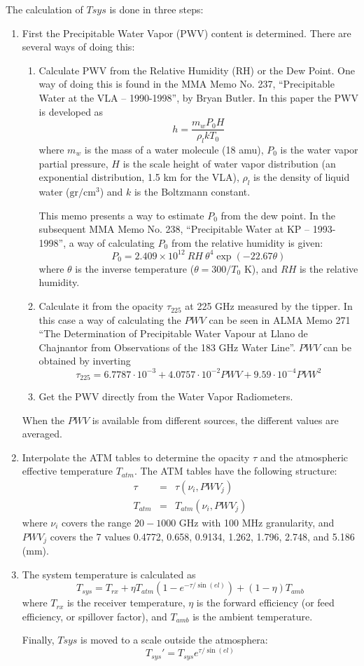 \documentclass{article}
\begin{document}
The calculation of $Tsys$ is done in three steps:
\begin{enumerate}
\item First the Precipitable Water Vapor (PWV) content is determined. There are
several ways of doing this:
\begin{enumerate}
\item Calculate PWV from the Relative Humidity (RH) or the Dew Point. One way
of doing this is found in the MMA Memo No. 237, ``Precipitable Water at the VLA --
1990-1998'', by Bryan Butler. In this paper the PWV is developed as
$$
h = \frac{m_w P_0 H}{\rho_l k T_0}
$$
where $m_w$ is the mass of a water molecule (18 amu), $P_0$ is the water vapor
partial pressure, $H$ is the scale height of water vapor distribution (an
exponential distribution, 1.5 km for the VLA), $\rho_l$ is the density of
liquid water ($\mathrm{gr}/\mathrm{cm}^3$) and $k$ is the Boltzmann constant.

This memo presents a way to estimate $P_0$ from the dew point. In the subsequent
MMA Memo No. 238, ``Precipitable Water at KP -- 1993-1998'', a way of calculating
$P_0$ from the relative humidity is given:
$$
P_0 = 2.409 \times 10^{12} \ RH\ \theta^4 \exp(-22.67\theta)
$$
where $\theta$ is the inverse temperature ($\theta = 300/T_0 $ K), and $RH$ is
the relative humidity.

\item Calculate it from the opacity $\tau_{225}$ at 225 GHz measured by the
tipper. In this case a way of calculating the $PWV$ can be seen in
ALMA Memo 271 ``The Determination of Precipitable Water Vapour at Llano de
Chajnantor from Observations of the 183 GHz Water Line''. $PWV$ can be obtained
by inverting
$$
\tau_{225} = 6.7787\cdot 10^{-3} + 4.0757\cdot 10^{-2} PWV + 9.59\cdot 10^{-4} PVW^2
$$
\item Get the PWV directly from the Water Vapor Radiometers.
\end{enumerate}
When the $PWV$ is available from different sources, the different values
are averaged.

\item Interpolate the ATM tables to determine the opacity $\tau$ and the
atmospheric effective temperature $T_{atm}$. The ATM tables have the following structure:
\begin{eqnarray*}
\tau & = & \tau(\nu_i, PWV_j) \\
T_{atm} & = & T_{atm}(\nu_i, PWV_j)
\end{eqnarray*}
where $\nu_i$ covers the range $20-1000$ GHz with 100 MHz granularity, and $PWV_j$
covers the 7 values 0.4772, 0.658, 0.9134, 1.262, 1.796, 2.748, and 5.186 (mm). 
\item The system temperature is calculated as
$$
T_{sys} = T_{rx} + \eta T_{atm} \left ( 1 - e^{-\tau/\sin(el)} \right ) + (1 - \eta) T_{amb}
$$
where $T_{rx}$ is the receiver temperature, $\eta$ is the forward efficiency (or
feed efficiency, or spillover factor), and $T_{amb}$ is the ambient temperature.

Finally, $Tsys$ is moved to a scale outside the atmosphera:
$$
T_{sys}' = T_{sys} e^{\tau/\sin(el)}
$$
\end{enumerate}
\end{document}
